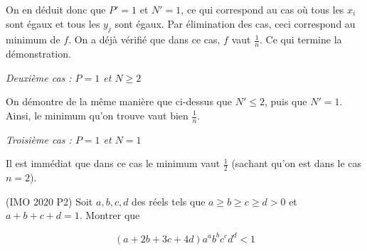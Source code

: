 \begin{sol}
On en déduit donc que $P'=1$ et $N'=1$, ce qui correspond au cas où tous les $x_i$ sont égaux et tous les $y_j$ sont égaux. Par élimination des cas, ceci correspond au minimum de $f$. On a déjà vérifié que dans ce cas, $f$ vaut $\frac1{n}$. Ce qui termine la démonstration.

\textit{Deuxième cas : $P=1$ et $N \geq 2$}

On démontre de la même manière que ci-dessus que $N' \leq 2$, puis que $N'=1$. Ainsi, le minimum qu'on trouve vaut bien $\frac1{n}$.

\textit{Troisième cas : $P=1$ et $N=1$}

Il est immédiat que dans ce cas le minimum vaut $\frac12$ (sachant qu'on est dans le cas $n=2$).
\end{sol}

\begin{exo}
(IMO 2020 P2)
Soit $a,b,c,d$ des réels tels que $a\geqslant b \geqslant c\geqslant d >0$ et $a+b+c+d=1$. Montrer que

\[(a+2b+3c+4d)a^ab^bc^cd^d<1\]

\end{exo}

